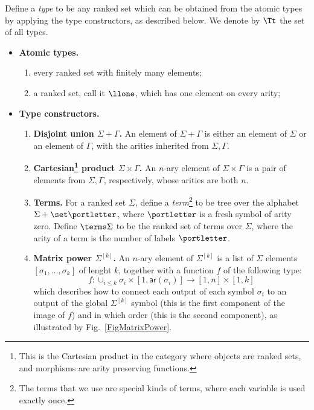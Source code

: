 \begin{definition}[Types]\label{def:types}
    Define a \emph{type} to be any ranked set which can be obtained from the atomic types by applying the type constructors, as described below. We denote by $\Tt$ the set of all types. 
    \begin{itemize}
        \item {\bf Atomic types.} 
           \begin{enumerate}
            \item every ranked set with finitely many elements;
            \item a ranked set, call it  $\llone$, which has one element on every arity;
        \end{enumerate}
    \item {\bf Type constructors.} 
     \begin{enumerate}
        \item {\bf Disjoint union $\Sigma+\Gamma$.} An element of $\Sigma+\Gamma$ is either an element of $\Sigma$ or an element of $\Gamma$, with the arities inherited from $\Sigma,\Gamma$. 
        \item {\bf Cartesian\footnote{This is the Cartesian product in the category where objects are ranked sets, and morphisms are arity preserving functions.}  product $\Sigma \times \Gamma$.} An  $n$-ary element of $\Sigma \times \Gamma$ is a pair of elements from $\Sigma, \Gamma$, respectively, whose arities are both $n$.
        \item {\bf Terms.} For a ranked set  $\Sigma$, define a \emph{term}\footnote{The terms that we use are special kinds of terms, where each variable is used exactly once.} to be tree over the alphabet $\Sigma + \set \portletter$, where $\portletter$ is a fresh symbol of arity zero. Define $\terms \Sigma$ to be the ranked set of terms over $\Sigma$, where the arity of a term is the number of labels $\portletter$.
\item {\bf Matrix power $\Sigma^{[k]}$.} An $n$-ary element of $\Sigma^{[k]}$ is a list of $\Sigma$ elements $[\sigma_1,\dots,\sigma_k]$ of lenght $k$, together with a function $f$ of the following type:
\[f: \cup_{i\leq k} \sigma_i\times [1, \mathsf{ar}(\sigma_i)]\to [1,n]\times [1,k]\]
which describes how to connect each output of each symbol $\sigma_i$ to an output of the global $\Sigma^{[k]}$ symbol (this is the first component of the image of $f$) and in which order (this is the second component), as illustrated by Fig.~\ref{FigMatrixPower}.


\end{enumerate}
\end{itemize}
\end{definition}
